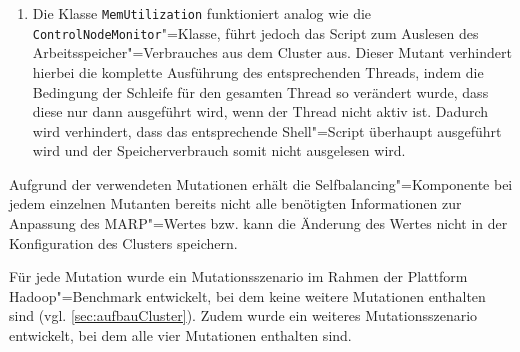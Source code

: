 \begin{enumerate}
    \item
    Die Klasse \texttt{MemUtilization} funktioniert analog wie die \texttt{ControlNodeMonitor}"=Klasse, führt jedoch das Script zum Auslesen des Arbeitsspeicher"=Verbrauches aus dem Cluster aus.
    Dieser Mutant verhindert hierbei die komplette Ausführung des entsprechenden Threads, indem die Bedingung der Schleife für den gesamten Thread so verändert wurde, dass diese nur dann ausgeführt wird, wenn der Thread nicht aktiv ist.
    Dadurch wird verhindert, dass das entsprechende Shell"=Script überhaupt ausgeführt wird und der Speicherverbrauch somit nicht ausgelesen wird.
\end{enumerate}

Aufgrund der verwendeten Mutationen erhält die Selfbalancing"=Komponente bei jedem einzelnen Mutanten bereits nicht alle benötigten Informationen zur Anpassung des \ac{MARP}"=Wertes bzw. kann die Änderung des Wertes nicht in der Konfiguration des Clusters speichern.

Für jede Mutation wurde ein Mutationsszenario im Rahmen der Plattform Hadoop"=Benchmark entwickelt, bei dem keine weitere Mutationen enthalten sind (vgl. \autoref{sec:aufbauCluster}).
Zudem wurde ein weiteres Mutationsszenario entwickelt, bei dem alle vier Mutationen enthalten sind.
